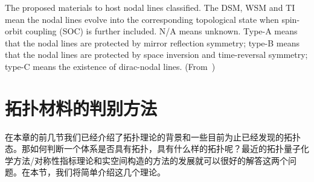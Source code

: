 \begin{table}\small
    \centering
    \caption{一些被理论或者实验认为是节线半金属的材料及其分类。（表格来自\citep{Fang2016cpb}）}
    {The proposed materials to host nodal lines classified. The DSM, WSM and TI mean the nodal lines evolve into the corresponding topological state when spin-orbit coupling (SOC) is further included. N/A means unknown. Type-A means that the nodal lines are protected by mirror reflection symmetry; type-B means that the nodal lines are protected by space inversion and time-reversal symmetry; type-C means the existence of dirac-nodal lines. (From~\citep{Fang2016cpb})}
    \label{table:1-3}
\end{table}
    
\section{拓扑材料的判别方法}\label{sec:topodiag}
在本章的前几节我们已经介绍了拓扑理论的背景和一些目前为止已经发现的拓扑态。那如何判断一个体系是否具有拓扑，具有什么样的拓扑呢？最近的拓扑量子化学方法/对称性指标理论和实空间构造的方法的发展就可以很好的解答这两个问题。在本节，我们将简单介绍这几个理论。

